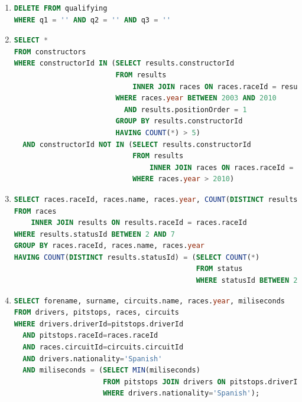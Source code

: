 \documentclass{db-practice}
\begin{document}
\begin{enumerate}
\item
\begin{lstlisting}[language=SQL]
DELETE FROM qualifying
WHERE q1 = '' AND q2 = '' AND q3 = ''
\end{lstlisting}
       
\item
\begin{lstlisting}[language=SQL]
SELECT *
FROM constructors
WHERE constructorId IN (SELECT results.constructorId
                        FROM results
                            INNER JOIN races ON races.raceId = results.raceId
                        WHERE races.year BETWEEN 2003 AND 2010
                          AND results.positionOrder = 1
                        GROUP BY results.constructorId
                        HAVING COUNT(*) > 5)
  AND constructorId NOT IN (SELECT results.constructorId
                            FROM results
                                INNER JOIN races ON races.raceId = results.raceId
                            WHERE races.year > 2010)
\end{lstlisting}

\item
\begin{lstlisting}[language=SQL]
SELECT races.raceId, races.name, races.year, COUNT(DISTINCT results.statusId)
FROM races
    INNER JOIN results ON results.raceId = races.raceId
WHERE results.statusId BETWEEN 2 AND 7
GROUP BY races.raceId, races.name, races.year
HAVING COUNT(DISTINCT results.statusId) = (SELECT COUNT(*)
                                           FROM status
                                           WHERE statusId BETWEEN 2 AND 7)
\end{lstlisting}

\item
\begin{lstlisting}[language=SQL]
SELECT forename, surname, circuits.name, races.year, miliseconds
FROM drivers, pitstops, races, circuits
WHERE drivers.driverId=pitstops.driverId 
  AND pitstops.raceId=races.raceId
  AND races.circuitId=circuits.circuitId
  AND drivers.nationality='Spanish'
  AND miliseconds = (SELECT MIN(miliseconds)
                     FROM pitstops JOIN drivers ON pitstops.driverId=drivers.driverId
                     WHERE drivers.nationality='Spanish');
\end{lstlisting}


\end{enumerate}
\end{document}
